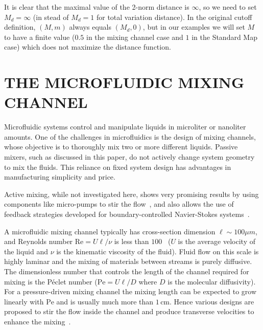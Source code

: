 \documentclass[twocolumn,10pt]{asme2e}
\begin{document}
It is clear that the maximal value of the 2-norm distance is $\infty$,
so we need to set $M_d=\infty$ (in stead of $M_d=1$ for total
variation distance). In the original cutoff definition, $(M,m)$ always
equals $(M_d,0)$, but in our examples we will set $M$ to have a finite
value ($0.5$ in the mixing channel case and $1$ in the Standard Map
case) which does not maximize the distance function.


\section*{THE MICROFLUIDIC MIXING CHANNEL}%



Microfluidic systems control and manipulate liquids in microliter or
nanoliter amounts. One of the challenges in microfluidics is the
design of mixing channels, whose objective is to thoroughly mix two or
more different liquids. Passive mixers, such as discussed in this
paper, do not actively change system geometry to mix the fluids. This
reliance on fixed system design has advantages in manufacturing
simplicity and price.

Active mixing, while not investigated here, shows very promising
results by using components like micro-pumps to stir the
flow~\cite{Yang2000}, and also allows the use of feedback strategies
developed for boundary-controlled Navier-Stokes
systems~\cite{AaKrBe2003, BaAaKr2005, AaKr2004, YuKrBe2004, AaKr2002}.

A microfluidic mixing channel typically has cross-section dimension
$\ell\sim 100\mu m$, and Reynolds number $\text{Re}=U\ell/\nu$ is less
than $100$~\cite{Stroock2002} ($U$ is the average velocity of the
liquid and $\nu$ is the kinematic viscosity of the fluid).  Fluid flow
on this scale is highly laminar and the mixing of materials between
streams is purely diffusive. The dimensionless number that controls
the length of the channel required for mixing is the P\'{e}clet number
($\text{Pe}= U\ell/D$ where $D$ is the molecular diffusivity). For a
pressure-driven mixing channel the mixing length can be expected to
grow linearly with $\text{Pe}$ and is usually much more than
$1\,\text{cm}$. Hence various designs are proposed to stir the flow
inside the channel and produce transverse velocities to enhance the
mixing~\cite{Stroock2002, Ottino2004Science}.
\end{document}
